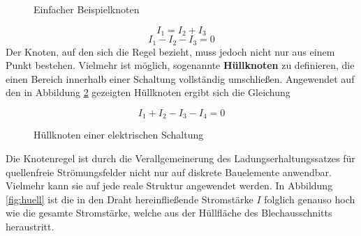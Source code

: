 \begin{frame}
{\begin{figure}[ht]

			{\caption{Einfacher Beispielknoten}\label{fig:knoten}}
		\end{figure}





		\begin{equation*}
			I_1 = I_2 + I_3
		\end{equation*}
		\begin{equation*}
			I_1 - I_2 - I_3 = 0
		\end{equation*}
		Der Knoten, auf den sich die Regel bezieht, muss jedoch nicht nur aus einem Punkt bestehen.
		Vielmehr ist möglich, sogenannte \textbf{Hüllknoten} zu definieren, die einen Bereich
		innerhalb einer Schaltung vollständig umschließen.
		Angewendet auf den in Abbildung \ref{fig:knoten2}
		gezeigten Hüllknoten ergibt sich die Gleichung

		\begin{equation*}
			I_1 + I_2 - I_3 - I_4 = 0
		\end{equation*}


		\begin{figure}[ht]
			\begin{center}
				
			\end{center}
			\caption{Hüllknoten einer elektrischen Schaltung\label{fig:knoten2}}

		\end{figure}

		Die Knotenregel ist durch die Verallgemeinerung des Ladungserhaltungssatzes für quellenfreie
		Strömungsfelder nicht nur auf diskrete Bauelemente anwendbar. Vielmehr kann sie auf jede reale
		Struktur angewendet werden. In Abbildung \ref{fig:huell} ist die in den Draht hereinfließende Stromstärke
		$I$ folglich genauso hoch wie die gesamte Stromstärke, welche aus der Hüllfläche des Blechausschnitts heraustritt.



}
\end{frame}
